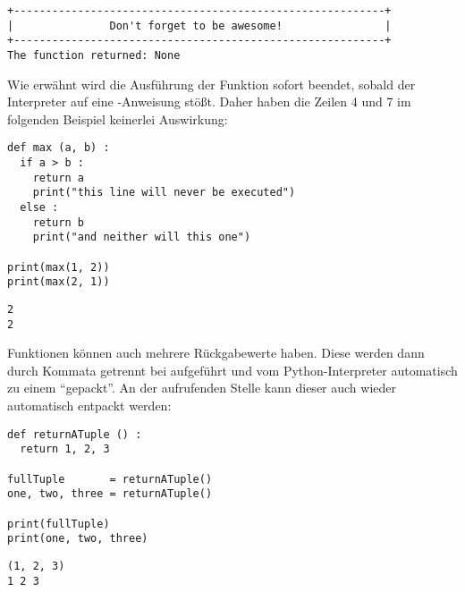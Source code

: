 \begin{cmdbox}
\begin{verbatim}
+----------------------------------------------------------+
|               Don't forget to be awesome!                |
+----------------------------------------------------------+
The function returned: None
\end{verbatim}
\end{cmdbox}

Wie erwähnt wird die Ausführung der Funktion sofort beendet, sobald der Interpreter auf eine -Anweisung stößt. Daher haben die Zeilen 4 und 7 im folgenden Beispiel keinerlei Auswirkung:
\begin{codebox}
\begin{verbatim}
def max (a, b) :
  if a > b :
    return a
    print("this line will never be executed")
  else :
    return b
    print("and neither will this one")

print(max(1, 2))
print(max(2, 1))
\end{verbatim}
\end{codebox}

\begin{cmdbox}
\begin{verbatim}
2
2
\end{verbatim}
\end{cmdbox}

Funktionen können auch mehrere Rückgabewerte haben. Diese werden dann durch Kommata getrennt bei  aufgeführt und vom Python-Interpreter automatisch zu einem  \enquote{gepackt}. An der aufrufenden Stelle kann dieser  auch wieder automatisch entpackt werden:
\begin{codebox}
\begin{verbatim}
def returnATuple () :
  return 1, 2, 3

fullTuple       = returnATuple()
one, two, three = returnATuple()

print(fullTuple)
print(one, two, three)
\end{verbatim}
\end{codebox}

\begin{cmdbox}
\begin{verbatim}
(1, 2, 3)
1 2 3
\end{verbatim}
\end{cmdbox}

